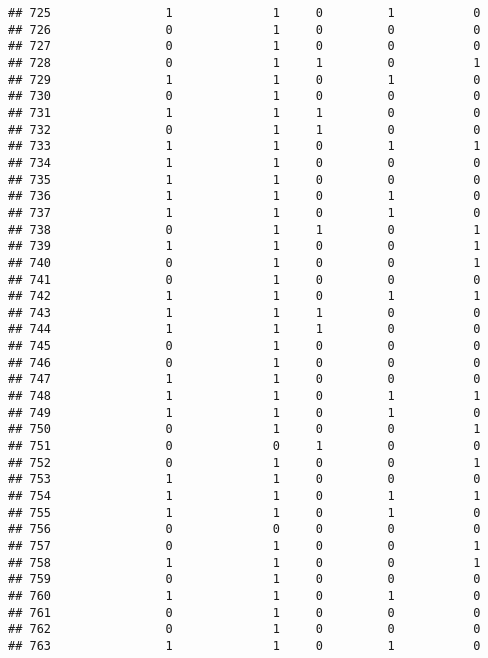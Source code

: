 \documentclass[]{article}
\begin{document}
\begin{verbatim}
## 725                1              1     0         1           0
## 726                0              1     0         0           0
## 727                0              1     0         0           0
## 728                0              1     1         0           1
## 729                1              1     0         1           0
## 730                0              1     0         0           0
## 731                1              1     1         0           0
## 732                0              1     1         0           0
## 733                1              1     0         1           1
## 734                1              1     0         0           0
## 735                1              1     0         0           0
## 736                1              1     0         1           0
## 737                1              1     0         1           0
## 738                0              1     1         0           1
## 739                1              1     0         0           1
## 740                0              1     0         0           1
## 741                0              1     0         0           0
## 742                1              1     0         1           1
## 743                1              1     1         0           0
## 744                1              1     1         0           0
## 745                0              1     0         0           0
## 746                0              1     0         0           0
## 747                1              1     0         0           0
## 748                1              1     0         1           1
## 749                1              1     0         1           0
## 750                0              1     0         0           1
## 751                0              0     1         0           0
## 752                0              1     0         0           1
## 753                1              1     0         0           0
## 754                1              1     0         1           1
## 755                1              1     0         1           0
## 756                0              0     0         0           0
## 757                0              1     0         0           1
## 758                1              1     0         0           1
## 759                0              1     0         0           0
## 760                1              1     0         1           0
## 761                0              1     0         0           0
## 762                0              1     0         0           0
## 763                1              1     0         1           0

\end{verbatim}
\end{document}
